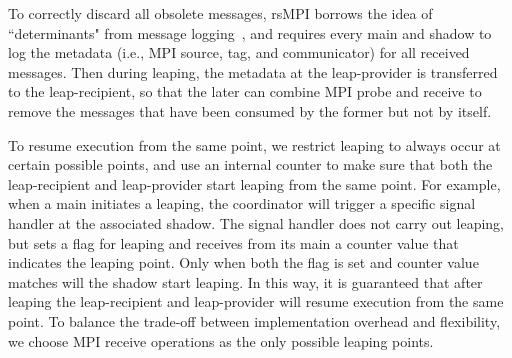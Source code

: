 To correctly discard all obsolete messages, rsMPI borrows the idea of ``determinants" from message logging~\cite{Elnozahy:02:Survey}, and requires every main and shadow to log the metadata (i.e., MPI source, tag, and communicator) for all received messages. Then during leaping, the metadata at the leap-provider is transferred to the leap-recipient, so that the later can combine MPI probe and receive to remove the messages that have been consumed by the former but not by itself.

To resume execution from the same point, we restrict leaping to always occur at certain possible points, and use an internal counter to make sure that both the leap-recipient and leap-provider start leaping from the same point. For example, when a main initiates a leaping, the coordinator will trigger a specific signal handler at the associated shadow. The signal handler does not carry out leaping, but sets a flag for leaping and receives from its main a counter value that indicates the leaping point. %
Only when both the flag is set and counter value matches will the shadow start leaping. In this way, it is guaranteed that after leaping the leap-recipient and leap-provider will resume execution from the same point. To balance the trade-off between implementation overhead and flexibility, we choose MPI receive operations as the only possible leaping points. 

 




